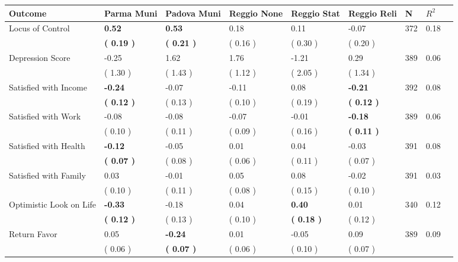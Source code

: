 \begin{tabular}{L{6.2cm} C{1.8cm} C{1.8cm} C{1.8cm} C{1.8cm} C{1.8cm} C{1.8cm} C{0.3cm} C{0.3cm}}
\toprule
 \textbf{Outcome} & \textbf{Parma Muni} & \textbf{Padova Muni} & \textbf{Reggio None} & \textbf{Reggio Stat} & \textbf{Reggio Reli} & \textbf{N} & \textbf{$ R^2$} \\
\midrule
Locus of Control & \textbf{     0.52} & \textbf{     0.53} &      0.18 &      0.11 &     -0.07  & 372 &       0.18 \\ 
 & \textbf{(     0.19 )} & \textbf{(     0.21 )} & (     0.16 ) & (     0.30 ) & (     0.20 )  & \\
Depression Score &     -0.25 &      1.62 &      1.76 &     -1.21 &      0.29  & 389 &       0.06 \\ 
 & (     1.30 ) & (     1.43 ) & (     1.12 ) & (     2.05 ) & (     1.34 )  & \\
Satisfied with Income & \textbf{    -0.24} &     -0.07 &     -0.11 &      0.08 & \textbf{    -0.21}  & 392 &       0.08 \\ 
 & \textbf{(     0.12 )} & (     0.13 ) & (     0.10 ) & (     0.19 ) & \textbf{(     0.12 )}  & \\
Satisfied with Work &     -0.08 &     -0.08 &     -0.07 &     -0.01 & \textbf{    -0.18}  & 389 &       0.06 \\ 
 & (     0.10 ) & (     0.11 ) & (     0.09 ) & (     0.16 ) & \textbf{(     0.11 )}  & \\
Satisfied with Health & \textbf{    -0.12} &     -0.05 &      0.01 &      0.04 &     -0.03  & 391 &       0.08 \\ 
 & \textbf{(     0.07 )} & (     0.08 ) & (     0.06 ) & (     0.11 ) & (     0.07 )  & \\
Satisfied with Family &      0.03 &     -0.01 &      0.05 &      0.08 &     -0.02  & 391 &       0.03 \\ 
 & (     0.10 ) & (     0.11 ) & (     0.08 ) & (     0.15 ) & (     0.10 )  & \\
Optimistic Look on Life & \textbf{    -0.33} &     -0.18 &      0.04 & \textbf{     0.40} &      0.01  & 340 &       0.12 \\ 
 & \textbf{(     0.12 )} & (     0.13 ) & (     0.10 ) & \textbf{(     0.18 )} & (     0.12 )  & \\
Return Favor &      0.05 & \textbf{    -0.24} &      0.01 &     -0.05 &      0.09  & 389 &       0.09 \\ 
 & (     0.06 ) & \textbf{(     0.07 )} & (     0.06 ) & (     0.10 ) & (     0.07 )  & \\

\end{tabular}
